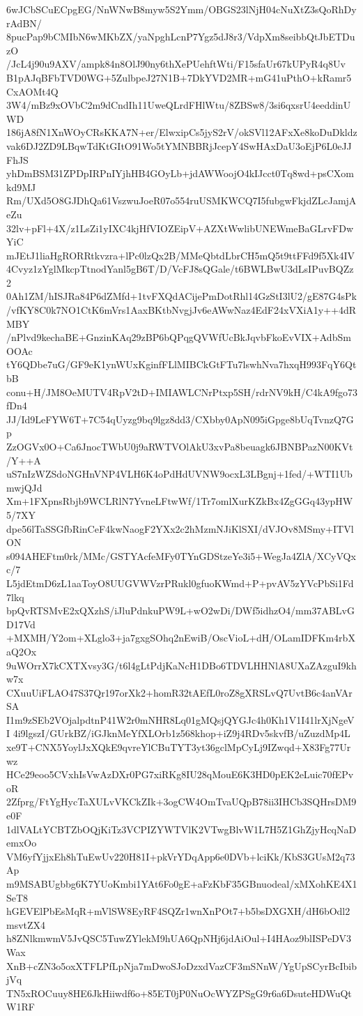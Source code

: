 6wJCbSCuECpgEG/NnWNwB8myw5S2Ymm/OBGS23lNjH04cNuXtZ3sQoRhDyrAdBN/
8pucPap9bCMIbN6wMKbZX/yaNpghLcnP7Ygz5dJ8r3/VdpXm8seibbQtJbETDuzO
/JcL4j90u9AXV/ampk84n8OlJ90ny6thXePUehftWti/F15sfaUr67kUPyR4q8Uv
B1pAJqBFbTVD0WG+5ZulbpeJ27N1B+7DkYVD2MR+mG41uPthO+kRamr5CxAOMt4Q
3W4/mBz9xOVbC2m9dCndIh11UweQLrdFHlWtu/8ZBSw8/3si6qxsrU4eeddinUWD
186jA8fN1XnWOyCRsKKA7N+er/ElwxipCs5jyS2rV/okSVl12AFxXe8koDuDkldz
vak6DJ2ZD9LBqwTdKtGItO91Wo5tYMNBBRjJcepY4SwHAxDaU3oEjP6L0eJJFhJS
yhDmBSM31ZPDpIRPnIYjhHB4GOyLb+jdAWWoojO4kIJcct0Tq8wd+psCXomkd9MJ
Rm/UXd5O8GJDhQa61VszwuJoeR07o554ruUSMKWCQ7I5fubgwFkjdZLcJamjAeZu
32lv+pFl+4X/z1LsZi1yIXC4kjHfVIOZEipV+AZXtWwlibUNEWmeBaGLrvFDwYiC
mJEtJ1liaHgRORRtkvzra+lPc0lzQx2B/MMeQbtdLbrCH5mQ5t9ttFFd9f5Xk4IV
4Cvyz1zYglMkcpTtnodYanl5gB6T/D/VcFJ8sQGale/t6BWLBwU3dLsIPuvBQZz2
0Ah1ZM/hISJRa84P6dZMfd+1tvFXQdACijePmDotRhl14GzStI3lU2/gE87G4sPk
/vfKY8C0k7NO1CtK6mVrs1AaxBKtbNvgjJv6eAWwNaz4EdF24xVXiA1y++4dRMBY
/nPlvd9kechaBE+GnzinKAq29zBP6bQPqgQVWfUcBkJqvbFkoEvVIX+AdbSmOOAc
tY6QDbe7uG/GF9eK1ynWUxKginfFLlMIBCkGtFTu7lswhNva7hxqH993FqY6QtbB
conu+H/JM8OeMUTV4RpV2tD+IMIAWLCNrPtxp5SH/rdrNV9kH/C4kA9fgo73fDn4
JJ/Id9LeFYW6T+7C54qUyzg9bq9lgz8dd3/CXbby0ApN095iGpge8bUqTvnzQ7Gp
ZzOGVx0O+Ca6JnocTWbU0j9aRWTVOlAkU3xvPa8beuagk6JBNBPazN00KVt/Y++A
uS7nIzWZSdoNGHnVNP4VLH6K4oPdHdUVNW9ocxL3LBgnj+1fed/+WTI1UbmwjQJd
Xm+1FXpnsRbjb9WCLRlN7YvneLFtwWf/1Tr7omlXurKZkBx4ZgGGq43ypHW5/7XY
dpe56lTaSSGfbRinCeF4kwNaogF2YXx2c2hMzmNJiKlSXI/dVJOv8MSmy+ITVlON
s094AHEFtm0rk/MMc/GSTYAcfeMFy0TYnGDStzeYe3i5+WegJa4ZlA/XCyVQxc/7
L5jdEtmD6zL1aaToyO8UUGVWVzrPRukl0gfuoKWmd+P+pvAV5zYVcPbSi1Fd7lkq
bpQvRTSMvE2xQXzhS/iJluPdnkuPW9L+wO2wDi/DWf5idhzO4/mm37ABLvGD17Vd
+MXMH/Y2om+XLglo3+ja7gxgSOhq2nEwiB/OscVioL+dH/OLamIDFKm4rbXaQ2Ox
9uWOrrX7kCXTXvsy3G/t6l4gLtPdjKaNcH1DBo6TDVLHHNlA8UXaZAzguI9khw7x
CXuuUiFLAO47S37Qr197orXk2+homR32tAEfL0roZ8gXRSLvQ7UvtB6c4anVArSA
I1m9zSEb2VOjalpdtnP41W2r0mNHR8Lq01gMQsjQYGJc4h0Kh1V1I41lrXjNgeVI
4i9lgszI/GUrkBZ/iGJknMeYfXLOrb1z568khop+iZ9j4RDv5skvfB/uZuzdMp4L
xe9T+CNX5YoylJxXQkE9qvreYlCBuTYT3yt36gclMpCyLj9IZwqd+X83Fg77Urwz
HCe29eoo5CVxhIsVwAzDXr0PG7xiRKg8IU28qMouE6K3HD0pEK2eLuic70fEPvoR
2Zfprg/FtYgHycTaXULvVKCkZIk+3ogCW4OmTvaUQpB78ii3IHCb3SQHrsDM9e0F
1dlVALtYCBTZbOQjKiTz3VCPIZYWTVlK2VTwgBlvW1L7H5Z1GhZjyHcqNaDemxOo
VM6yfYjjxEh8hTuEwUv220H81I+pkVrYDqApp6e0DVb+lciKk/KbS3GUsM2q73Ap
m9MSABUgbbg6K7YUoKmbi1YAt6Fo0gE+aFzKbF35GBnuodeal/xMXohKE4X1SeT8
hGEVElPbEsMqR+mVlSW8EyRF4SQZr1wnXnPOt7+b5bsDXGXH/dH6bOdl2msvtZX4
h8ZNlkmwmV5JvQSC5TuwZYlekM9hUA6QpNHj6jdAiOul+I4HAoz9blISPeDV3Wax
XnB+cZN3o5oxXTFLPfLpNja7mDwoSJoDzxdVazCF3mSNnW/YgUpSCyrBcIbibjVq
TN5xROCuuy8HE6JkHiiwdf6o+85ET0jP0NuOcWYZPSgG9r6a6DsuteHDWuQtW1RF
